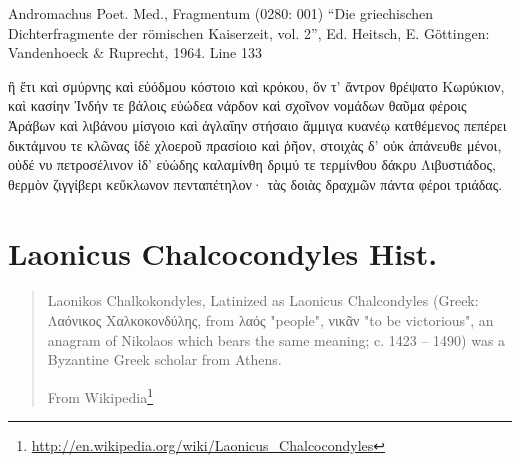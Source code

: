 \documentclass[12pt,letterpaper,twoside,final]{memoir}
\begin{document}
\begin{greek}

Andromachus Poet. Med., Fragmentum (0280: 001)
“Die griechischen Dichterfragmente der römischen Kaiserzeit, vol. 2”, Ed. Heitsch, E.
Göttingen: Vandenhoeck \& Ruprecht, 1964.
Line 133

ἢ ἔτι καὶ σμύρνης καὶ εὐόδμου κόστοιο 
 καὶ κρόκου, ὅν τ' ἄντρον θρέψατο Κωρύκιον, 
καὶ κασίην Ἰνδήν τε βάλοις εὐώδεα νάρδον 
 καὶ σχοῖνον νομάδων θαῦμα φέροις Ἀράβων 
καὶ λιβάνου μίσγοιο καὶ ἀγλαΐην στήσαιο 
 ἄμμιγα κυανέῳ κατθέμενος πεπέρει 
δικτάμνου τε κλῶνας ἰδὲ χλοεροῦ πρασίοιο 
 καὶ ῥῆον, στοιχὰς δ' οὐκ ἀπάνευθε μένοι, 
οὐδέ νυ πετροσέλινον ἰδ' εὐώδης καλαμίνθη 
 δριμύ τε τερμίνθου δάκρυ Λιβυστιάδος, 
θερμὸν ζιγγίβερι κεὔκλωνον πενταπέτηλον· 
 τὰς δοιὰς δραχμῶν πάντα φέροι τριάδας. 

\end{greek}


\section{Laonicus Chalcocondyles Hist.}

\blockquote[From Wikipedia\footnote{\url{http://en.wikipedia.org/wiki/Laonicus_Chalcocondyles}}]{Laonikos Chalkokondyles, Latinized as Laonicus Chalcondyles (Greek: Λαόνικος Χαλκοκονδύλης, from λαός "people", νικᾶν "to be victorious", an anagram of Nikolaos which bears the same meaning; c. 1423 – 1490) was a Byzantine Greek scholar from Athens.}
\end{document}
